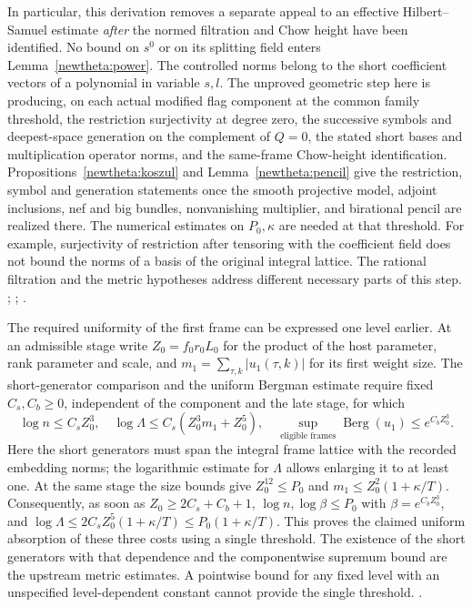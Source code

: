 In particular, this derivation removes a separate appeal to an effective
Hilbert--Samuel estimate \emph{after} the normed filtration and Chow
height have been identified. No bound on \(s^0\) or on its splitting
field enters Lemma~\ref{newtheta:power}. The controlled norms belong
to the short coefficient vectors of a polynomial in variable \(s,l\).
The unproved geometric step here is producing, on each actual modified
flag component at the common family threshold, the restriction
surjectivity at degree zero, the successive symbols and deepest-space
generation on the complement of \(Q=0\), the stated short bases and
multiplication operator norms, and the same-frame Chow-height
identification. Propositions~\ref{newtheta:koszul} and
Lemma~\ref{newtheta:pencil} give the restriction, symbol and generation
statements once the smooth projective model, adjoint inclusions,
nef and big bundles, nonvanishing multiplier, and birational
pencil are realized there. The numerical estimates on \(P_0,\kappa\)
are needed at that threshold. For example, surjectivity of restriction after
tensoring with the coefficient field does not bound the norms of a
basis of the original integral lattice. The rational filtration and
the metric hypotheses address different necessary parts of this step.
;
;
.

The required uniformity of the first frame can be expressed one level
earlier. At an admissible stage write \(Z_0=f_0r_0L_0\) for the
product of the host parameter, rank parameter and scale, and
\(m_1=\sum_{\tau,k}|u_1(\tau,k)|\) for its first weight size.
The short-generator comparison and the uniform Bergman estimate
require fixed \(C_s,C_b\ge0\), independent of the component and the
late stage, for which
\[
 \log n\le C_s Z_0^3,\quad
 \log\Lambda\le C_s(Z_0^3m_1+Z_0^5),\quad
 \sup_{\text{eligible frames}}\operatorname{Berg}(u_1)
                         \le e^{C_bZ_0^3}.
\]
Here the short generators must span the integral frame lattice with
the recorded embedding norms; the logarithmic estimate for
\(\Lambda\) allows enlarging it to at least one.
At the same stage the size bounds give \(Z_0^{12}\le P_0\) and
\(m_1\le Z_0^2(1+\kappa/T)\).
Consequently, as soon as \(Z_0\ge2C_s+C_b+1\),
\(\log n,\log\beta\le P_0\) with \(\beta=e^{C_bZ_0^3}\),
and \(\log\Lambda\le2C_sZ_0^5(1+\kappa/T)\le
P_0(1+\kappa/T)\). This proves the claimed uniform absorption of
these three costs using a single threshold. The existence of the short
generators with that dependence and the componentwise supremum bound
are the upstream metric estimates. A pointwise bound for any fixed
level with an unspecified level-dependent constant cannot provide the
single threshold.
.

